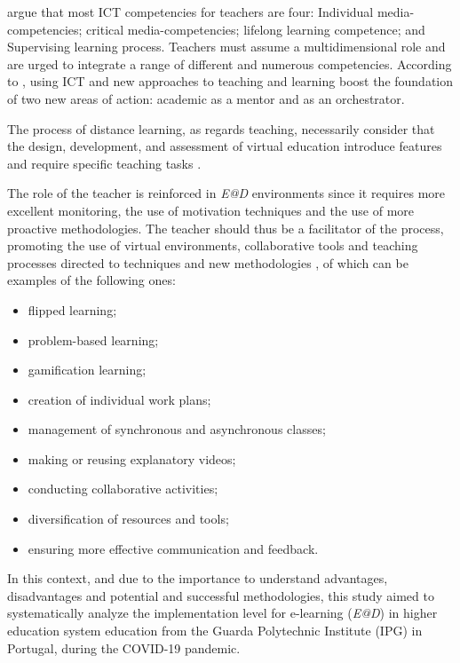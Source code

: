 \documentclass{textolivre}
\begin{document}
\textcite{zwaneveld2007} argue that most ICT competencies for teachers are four: Individual media-competencies; critical media-competencies; lifelong learning competence; and Supervising learning process. Teachers must assume a multidimensional role and are urged to integrate a range of different and numerous competencies. According to \textcite{wake2007}, using ICT and new approaches to teaching and learning boost the foundation of two new areas of action: academic as a mentor and as an orchestrator.

The process of distance learning, as regards teaching, necessarily consider that the design, development, and assessment of virtual education introduce features and require specific teaching tasks \cite{major2010, spector2007}.

The role of the teacher is reinforced in \emph{E@D} environments since it requires more excellent monitoring, the use of motivation techniques and the use of more proactive methodologies. The teacher should thus be a facilitator of the process, promoting the use of virtual environments, collaborative tools and teaching processes directed to techniques and new methodologies \cite{dunlap2008, amitg2015}, of which can be examples of the following ones:

\begin{itemize}
    \item flipped learning;
    \item problem-based learning;
    \item gamification learning;
    \item creation of individual work plans;
    \item management of synchronous and asynchronous classes;
    \item making or reusing explanatory videos;
    \item conducting collaborative activities;
    \item diversification of resources and tools;
    \item ensuring more effective communication and feedback.
\end{itemize}

In this context, and due to the importance to understand advantages, disadvantages and potential and successful methodologies, this study aimed to systematically analyze the implementation level for e-learning (\emph{E@D}) in higher education system education from the Guarda Polytechnic Institute (IPG) in Portugal, during the COVID-19 pandemic.
\end{document}
